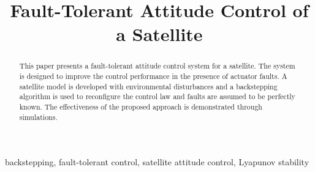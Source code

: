 \documentclass[conference]{IEEEtran}
\begin{document}
\title{Fault-Tolerant Attitude Control of a Satellite\\
}

\author{
\and
{}
}

\maketitle

\begin{abstract}
This paper presents a fault-tolerant attitude control system for a satellite. The system is designed to improve the control performance in the presence of actuator faults. A satellite model is developed with environmental disturbances and a backstepping algorithm is used to reconfigure the control law and faults are assumed to be perfectly known. The effectiveness of the proposed approach is demonstrated through simulations.
\end{abstract}

\begin{IEEEkeywords}
backstepping, fault-tolerant control, satellite attitude control, Lyapunov stability
\end{IEEEkeywords}



\end{document}
